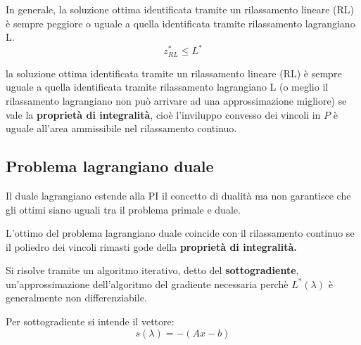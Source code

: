 \documentclass[\main/main.tex]{subfiles}
\begin{document}
\begin{theorem}
  In generale, la soluzione ottima identificata tramite un rilassamento lineare (RL) è sempre peggiore o uguale a quella identificata tramite rilassamento lagrangiano L.
  \[
    z^*_{RL} \leq L^*
  \]
\end{theorem}

\begin{theorem}
  la soluzione ottima identificata tramite un rilassamento lineare (RL) è sempre uguale a quella identificata tramite rilassamento lagrangiano L (o meglio il rilassamento lagrangiano non può arrivare ad una approssimazione migliore) se vale la \textbf{proprietà di integralità}, cioè l'inviluppo convesso dei vincoli in $P$ è uguale all'area ammissibile nel rilassamento continuo.
\end{theorem}

\subsection{Problema lagrangiano duale}
Il duale lagrangiano estende alla PI il concetto di dualità ma non garantisce che gli ottimi siano uguali tra il problema primale e duale.

\begin{theorem}
  L'ottimo del problema lagrangiano duale coincide con il rilassamento continuo se il poliedro dei vincoli rimasti gode della \textbf{proprietà di integralità.}
\end{theorem}

Si risolve tramite un algoritmo iterativo, detto del \textbf{sottogradiente}, un'approssimazione dell'algoritmo del gradiente necessaria perchè $L^*(\lambda)$ è generalmente non differenziabile.

\begin{definition}[Sottogradiente]
  Per sottogradiente si intende il vettore:
  \[
    s(\lambda) = -(Ax-b)
  \]
\end{definition}
\end{document}
